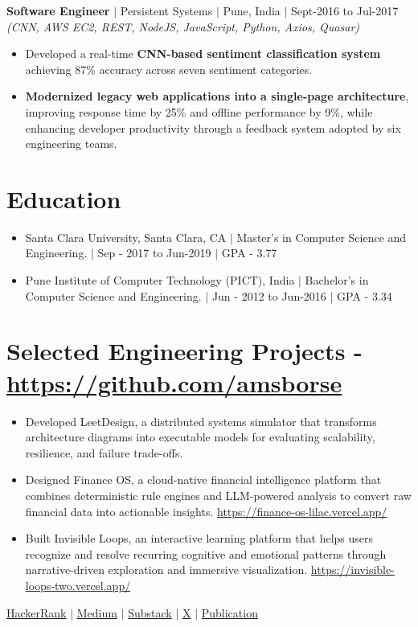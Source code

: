 \documentclass[10pt,letterpaper]{article}
\newcommand{\resumeItem}[1]{\item \small{#1}}
\newcommand{\role}[4]{
  \vspace{1.5pt}
  \textbf{#1} $|$ #2 $|$ #3 $|$ #4\\[-2pt]
}
\newcommand{\tech}[1]{\small\textit{(#1)}\vspace{1.5pt}}
\begin{document}
\role{Software Engineer}{Persistent Systems}{Pune, India}{Sept-2016 to Jul-2017}
\tech{CNN, AWS EC2, REST, NodeJS, JavaScript, Python, Axios, Quasar}
\begin{itemize}
    \resumeItem{Developed a real-time \textbf{CNN-based sentiment classification system} achieving 87\% accuracy across seven sentiment categories.}
    \resumeItem{\textbf{Modernized legacy web applications into a single-page architecture}, improving response time by 25\% and offline performance by 9\%, while enhancing developer productivity through a feedback system adopted by six engineering teams.}
\end{itemize}

\section{Education}
\begin{itemize}
    \resumeItem{Santa Clara University, Santa Clara, CA $|$ Master’s in Computer Science and Engineering. $|$ Sep - 2017 to Jun-2019 $|$ GPA - 3.77}
    \resumeItem{Pune Institute of Computer Technology (PICT), India $|$ Bachelor’s in Computer Science and Engineering. $|$ Jun - 2012 to Jun-2016 $|$ GPA - 3.34}
\end{itemize}

\section{Selected Engineering Projects - \href{https://github.com/amsborse}{https://github.com/amsborse}}
\begin{itemize}
    \resumeItem{Developed LeetDesign, a distributed systems simulator that transforms architecture diagrams into executable models for evaluating scalability, resilience, and failure trade-offs.}
    \resumeItem{Designed Finance OS, a cloud-native financial intelligence platform that combines deterministic rule engines and LLM-powered analysis to convert raw financial data into actionable insights. \href{https://finance-os-lilac.vercel.app/}{https://finance-os-lilac.vercel.app/}}
    \resumeItem{Built Invisible Loops, an interactive learning platform that helps users recognize and resolve recurring cognitive and emotional patterns through narrative-driven exploration and immersive visualization. \href{https://invisible-loops-two.vercel.app/}{https://invisible-loops-two.vercel.app/}}
\end{itemize}

\vfill
\begin{center}
    \small
    \href{https://hackerrank.com}{HackerRank} $|$ \href{https://medium.com}{Medium} $|$ \href{https://substack.com}{Substack} $|$ \href{https://x.com}{X} $|$ \href{https://amsborse.github.io}{Publication}
\end{center}
\end{document}
